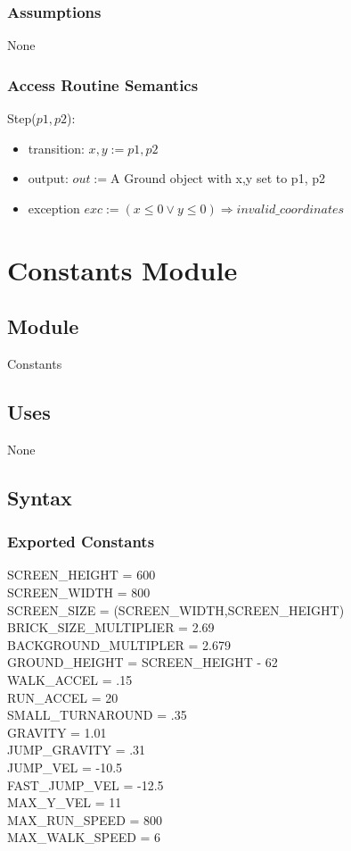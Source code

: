 \documentclass[12pt]{article}
\begin{document}
\subsubsection* {Assumptions}
None
\subsubsection* {Access Routine Semantics}

\noindent Step($p1, p2$):
\begin{itemize}
\item transition: $x,y := p1, p2$
\item output: $out := $A Ground object with x,y set to p1, p2
\item exception $ exc := (x \leq 0 \lor y \leq 0 ) \Rightarrow invalid\_coordinates $
\end{itemize}

\newpage


\section* {Constants Module}
\subsection*{Module}
Constants
\subsection* {Uses}
None
\subsection* {Syntax}
\subsubsection* {Exported Constants}
SCREEN\_HEIGHT = 600\\
SCREEN\_WIDTH = 800\\
SCREEN\_SIZE = (SCREEN\_WIDTH,SCREEN\_HEIGHT)\\
BRICK\_SIZE\_MULTIPLIER = 2.69\\
BACKGROUND\_MULTIPLER = 2.679\\
GROUND\_HEIGHT = SCREEN\_HEIGHT - 62\\
WALK\_ACCEL = .15\\
RUN\_ACCEL = 20\\
SMALL\_TURNAROUND = .35\\
GRAVITY = 1.01\\
JUMP\_GRAVITY = .31\\
JUMP\_VEL = -10.5\\
FAST\_JUMP\_VEL = -12.5\\
MAX\_Y\_VEL = 11\\
MAX\_RUN\_SPEED = 800\\
MAX\_WALK\_SPEED = 6\\
\end{document}
